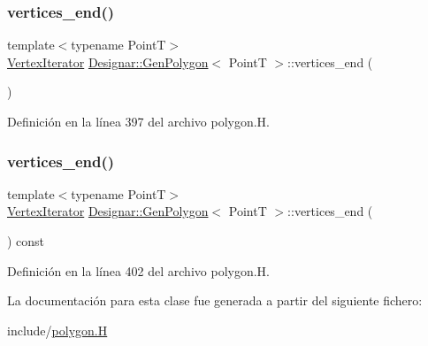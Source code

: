\subsubsection{\texorpdfstring{vertices\+\_\+end()}{vertices\_end()}\hspace{0.1cm}{\footnotesize\ttfamily [1/2]}}
{\footnotesize\ttfamily template$<$typename PointT$>$ \\
\hyperlink{class_designar_1_1_gen_polygon_1_1_vertex_iterator}{Vertex\+Iterator} \hyperlink{class_designar_1_1_gen_polygon}{Designar\+::\+Gen\+Polygon}$<$ PointT $>$\+::vertices\+\_\+end (\begin{DoxyParamCaption}{ }\end{DoxyParamCaption})\hspace{0.3cm}{\ttfamily [inline]}}



Definición en la línea 397 del archivo polygon.\+H.

\mbox{\label{class_designar_1_1_gen_polygon_ad409613d032d91895921d60e27250a14}} 
\subsubsection{\texorpdfstring{vertices\+\_\+end()}{vertices\_end()}\hspace{0.1cm}{\footnotesize\ttfamily [2/2]}}
{\footnotesize\ttfamily template$<$typename PointT$>$ \\
\hyperlink{class_designar_1_1_gen_polygon_1_1_vertex_iterator}{Vertex\+Iterator} \hyperlink{class_designar_1_1_gen_polygon}{Designar\+::\+Gen\+Polygon}$<$ PointT $>$\+::vertices\+\_\+end (\begin{DoxyParamCaption}{ }\end{DoxyParamCaption}) const\hspace{0.3cm}{\ttfamily [inline]}}



Definición en la línea 402 del archivo polygon.\+H.



La documentación para esta clase fue generada a partir del siguiente fichero\+:\begin{DoxyCompactItemize}
\item 
include/\hyperlink{polygon_8_h}{polygon.\+H}\end{DoxyCompactItemize}
